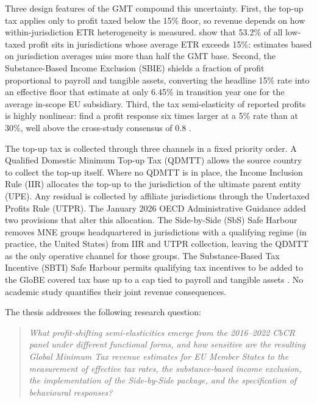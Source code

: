 \documentclass[11pt,a4paper]{article}
\begin{document}
Three design features of the GMT compound this uncertainty. First, the top-up tax applies only to profit taxed below the 15\% floor, so revenue depends on how within-jurisdiction ETR heterogeneity is measured. \citet{hugger2026} show that 53.2\% of all low-taxed profit sits in jurisdictions whose average ETR exceeds 15\%: estimates based on jurisdiction averages miss more than half the GMT base. Second, the Substance-Based Income Exclusion (SBIE) shields a fraction of profit proportional to payroll and tangible assets, converting the headline 15\% rate into an effective floor that \citet{devereux2023} estimate at only 6.45\% in transition year one for the average in-scope EU subsidiary. Third, the tax semi-elasticity of reported profits is highly nonlinear: \citet{dowd2017} find a profit response six times larger at a 5\% rate than at 30\%, well above the cross-study consensus of 0.8 \citep{heckemeyer2017}.

The top-up tax is collected through three channels in a fixed priority order. A Qualified Domestic Minimum Top-up Tax (QDMTT) allows the source country to collect the top-up itself. Where no QDMTT is in place, the Income Inclusion Rule (IIR) allocates the top-up to the jurisdiction of the ultimate parent entity (UPE). Any residual is collected by affiliate jurisdictions through the Undertaxed Profits Rule (UTPR). The January 2026 OECD Administrative Guidance added two provisions that alter this allocation. The Side-by-Side (SbS) Safe Harbour removes MNE groups headquartered in jurisdictions with a qualifying regime (in practice, the United States) from IIR and UTPR collection, leaving the QDMTT as the only operative channel for those groups. The Substance-Based Tax Incentive (SBTI) Safe Harbour permits qualifying tax incentives to be added to the GloBE covered tax base up to a cap tied to payroll and tangible assets \citep{oecd2026}. No academic study quantifies their joint revenue consequences.

The thesis addresses the following research question:

\begin{quote}
\textit{What profit-shifting semi-elasticities emerge from the 2016--2022 CbCR panel under different functional forms, and how sensitive are the resulting Global Minimum Tax revenue estimates for EU Member States to the measurement of effective tax rates, the substance-based income exclusion, the implementation of the Side-by-Side package, and the specification of behavioural responses?}
\end{quote}
\end{document}
